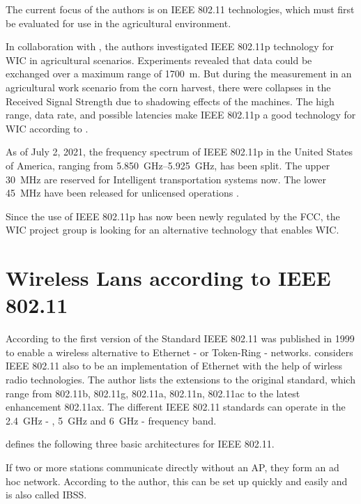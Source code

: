 \documentclass[]{nsm-thesis}
\begin{document}
The current focus of the authors is on IEEE 802.11 technologies, which must first be evaluated for use in the agricultural environment.

In collaboration with \textcite{klingler_agriculture_2018}, the authors investigated IEEE 802.11p technology for \ac{WIC} in agricultural scenarios. Experiments revealed that data could be exchanged over a maximum range of \SI{1700}{\metre}. But during the measurement in an agricultural work scenario from the corn harvest, there were collapses in the Received Signal Strength due to shadowing effects of the machines. The high range, data rate, and possible latencies make IEEE 802.11p a good technology for \ac{WIC} according to \textcite{schlingmann_challenges_2017}.

As of July 2, 2021, the frequency spectrum of IEEE 802.11p in the United States of America, ranging from \SIrange{5,850}{5,925}{\giga\hertz}, has been split. The upper \SI{30}{\mega\hertz} are reserved for Intelligent transportation systems now. The lower \SI{45}{\mega\hertz} have been released for unlicensed operations \cite{noauthor_use_2021}.

Since the use of IEEE 802.11p has now been newly regulated by the FCC, the \ac{WIC} project group is looking for an alternative technology that enables \ac{WIC}.
\section{Wireless Lans according to IEEE 802.11}
According to \textcite{kauffels_wireless_2002} the first version of the Standard IEEE 802.11 was published in 1999 to enable a wireless alternative to Ethernet - or Token-Ring - networks.
\textcite{sauter_wireless_2022} considers IEEE 802.11 also to be an implementation of Ethernet with the help of wirless radio technologies. The author lists the extensions to the original standard, which range from 802.11b, 802.11g, 802.11a, 802.11n, 802.11ac to the latest enhancement 802.11ax. The different IEEE 802.11 standards can operate in the  \SI{2.4}{\giga\hertz} - , \SI{5}{\giga\hertz} and \SI{6}{\giga\hertz} - frequency band. 


\textcite{kauffels_wireless_2002} defines the following three basic architectures for IEEE 802.11.

If two or more stations communicate directly without an AP, they form an ad hoc network. According to the author, this can be set up quickly and easily and is also called \ac{IBSS}.
\end{document}
